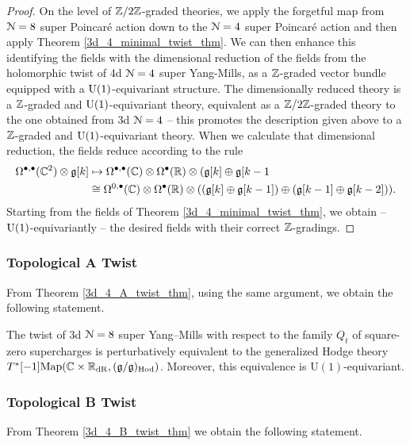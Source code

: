 \documentclass[10pt, oneside]{article}
\renewcommand{\U}{\mathrm{U}}
\begin{document}
\begin{proof}
On the level of $\mathbb Z/2\mathbb Z$-graded theories, we apply the forgetful map from $\mathcal{N}=8$ super Poincar\'e action down to the $\mathcal{N}=4$ super Poincar\'e action and then apply Theorem \ref{3d_4_minimal_twist_thm}.  We can then enhance this identifying the fields with the dimensional reduction of the fields from the holomorphic twist of 4d $\mathcal{N}=4$ super Yang-Mills, as a $\mathbb Z$-graded vector bundle equipped with a $\mathrm{U}(1)$-equivariant structure.  The dimensionally reduced theory is a $\mathbb Z$-graded and $\mathrm{U}(1)$-equivariant theory, equivalent as a $\mathbb Z/2\mathbb Z$-graded theory to the one obtained from 3d $\mathcal{N}=4$ -- this promotes the description given above to a $\mathbb Z$-graded and $\mathrm{U}(1)$-equivariant theory.  When we calculate that dimensional reduction, the fields reduce according to the rule
\begin{align*}
\Omega^{\bullet,\bullet}(\mathbb C^2) \otimes \mathfrak{g}[k] &\mapsto \Omega^{\bullet,\bullet}(\mathbb C) \otimes \Omega^\bullet(\mathbb R) \otimes (\mathfrak{g}[k] \oplus \mathfrak{g}[k-1 \\
&\cong \Omega^{0,\bullet}(\mathbb C)\otimes \Omega^\bullet(\mathbb R) \otimes ((\mathfrak{g}[k] \oplus \mathfrak{g}[k-1]) \oplus (\mathfrak{g}[k-1] \oplus \mathfrak{g}[k-2])).
\end{align*}
Starting from the fields of Theorem \ref{3d_4_minimal_twist_thm}, we obtain -- $\mathrm{U}(1)$-equivariantly -- the desired fields with their correct $\mathbb Z$-gradings.
\end{proof}

\subsubsection{Topological A Twist}
\label{sect:3d8A_Twist}
From Theorem \ref{3d_4_A_twist_thm}, using the same argument, we obtain the following statement.

\begin{theorem} 
The twist of 3d $\mathcal N=8$ super Yang--Mills with respect to the family $Q_t$ of square-zero supercharges is perturbatively equivalent to the generalized Hodge theory $T^*[-1]\mathrm{Map}(\mathbb C \times \mathbb R_{\mathrm{dR}}, (\mathfrak{g}/\mathfrak{g})_{\mathrm{Hod}})$. Moreover, this equivalence is $\U(1)$-equivariant.
\end{theorem}

\subsubsection{Topological B Twist}
\label{sect:3d8B_Twist}
From Theorem \ref{3d_4_B_twist_thm} we obtain the following statement.
\end{document}
